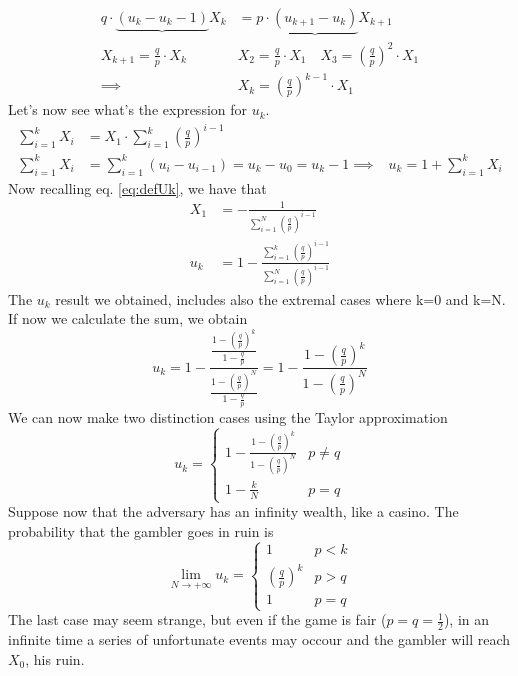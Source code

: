 \begin{equation}\begin{split}
q \cdot \underbrace{(u_k - u_k-1)}{X_k} &= p \cdot \underbrace{\left(u_{k+1} -u_k\right)}{X_{k+1}} \\
X_{k+1} = \frac{q}{p}\cdot X_k \quad & X_{2} = \frac{q}{p}\cdot X_1 \quad X_{3} = \left(\frac{q}{p}\right)^2 \cdot X_1\\
\implies & X_{k} = \left(\frac{q}{p}\right)^{k-1}\cdot X_1
\end{split}\end{equation}
Let's now see what's the expression for $u_k$.
\begin{equation}\begin{split}
	\sum\limits_{i=1}^{k}X_i &= X_1 \cdot \sum\limits_{i=1}^{k}\left(\frac{q}{p}\right)^{i-1} \\
	\sum\limits_{i=1}^{k}X_i &= \sum\limits_{i=1}^{k}(u_i-u_{i-1}) = u_k - u_0 = u_k -1
	\implies & u_k = 1+ \sum\limits_{i=1}^k X_i
\end{split}\end{equation}
Now recalling eq. \eqref{eq:defUk}, we have that
\begin{equation}\begin{split}
	X_1 &= -\frac{1}{\sum\limits_{i=1}^N \left(\frac{q}{p}\right)^{i-1}}\\
	u_k &= 1- \frac{\sum\limits_{i=1}^k\left(\frac{q}{p}\right)^{i-1}}{\sum\limits_{i=1}^N\left(\frac{q}{p}\right)^{i-1}}
\end{split}\end{equation}
The $u_k$ result we obtained, includes also the extremal cases where k=0 and k=N.\\
If now we calculate the sum, we obtain
\begin{equation}
	u_k = 1- \frac{\frac{1-\left(\frac{q}{p}\right)^k}{1-\frac{q}{p}}}{\frac{1-\left(\frac{q}{p}\right)^N}{1-\frac{q}{p}}}=
	1-\frac{1-\left(\frac{q}{p}\right)^k}{1-\left(\frac{q}{p}\right)^N}
\end{equation}
We can now make two distinction cases using the Taylor approximation
\begin{equation}u_k=\begin{cases}
	1-\frac{1-\left(\frac{q}{p}\right)^k}{1-\left(\frac{q}{p}\right)^N} & p \neq q \\
	1-\frac{k}{N} & p=q
\end{cases}\end{equation}
Suppose now that the adversary has an infinity wealth, like a casino. The probability
that the gambler goes in ruin is
\begin{equation}
	\lim_{N \to +\infty} u_k =
	\begin{cases}
		1 & p<k \\
		\left(\frac{q}{p}\right)^k & p>q\\
		1 & p=q
\end{cases}\end{equation}
The last case may seem strange, but even if the game is fair ($p=q=\frac{1}{2}$), in an infinite time
a series of unfortunate events may occour and the gambler will reach $X_0$, his ruin.

